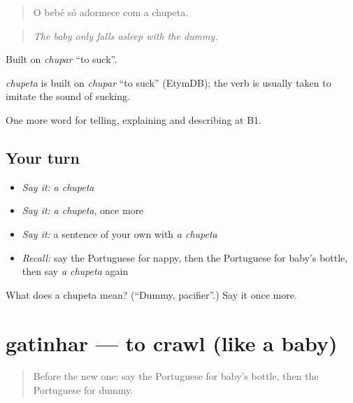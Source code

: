\begin{quote}
O bebé só adormece com a chupeta.
\end{quote}

\begin{quote}
\emph{The baby only falls asleep with the dummy.}
\end{quote}

Built on \emph{chupar} \textquotedblleft{}to suck\textquotedblright{}.

\begin{cousinweb}
\emph{chupeta} is built on \emph{chupar} \textquotedblleft{}to suck\textquotedblright{} (EtymDB); the verb is usually taken to imitate the sound of sucking.
\end{cousinweb}

\begin{grammarlens}[title={What you've built}]
One more word for telling, explaining and describing at B1.
\end{grammarlens}

\subsection*{Your turn}
\begin{itemize}
\raggedright
  \item \emph{Say it:} \emph{a chupeta}
  \item \emph{Say it:} \emph{a chupeta}, once more
  \item \emph{Say it:} a sentence of your own with \emph{a chupeta}
  \item \emph{Recall:} say the Portuguese for nappy, then the Portuguese for baby's bottle, then say \emph{a chupeta} again
\end{itemize}

\begin{tcolorbox}[breakable,colback=teal!4,colframe=teal!35!black,title={Before you move on}]
What does a chupeta mean? (\textquotedblleft{}Dummy, pacifier\textquotedblright{}.) Say it once more.
\end{tcolorbox}
\section[gatinhar]{gatinhar — to crawl (like a baby)}

\label{lesson:PT-C494-gatinhar}



\begin{quote}
Before the new one: say the Portuguese for baby's bottle, then the Portuguese for dummy.
\end{quote}

